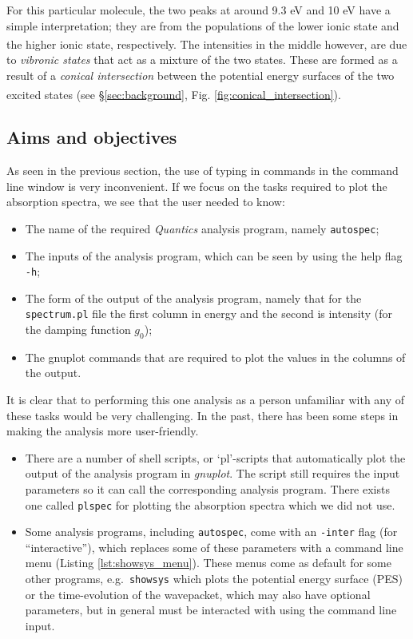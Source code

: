 \documentclass[12pt]{article}
\begin{document}
For this particular molecule, the two peaks at around 9.3 eV and 10 eV have a simple interpretation; they are from the populations of the lower ionic state and the higher ionic state, respectively.\textsuperscript{\cite{studying}} The intensities in the middle however, are due to \textit{vibronic states} that act as a mixture of the two states. These are formed as a result of a \textit{conical intersection} between the potential energy surfaces of the two excited states\textsuperscript{\cite{mysteryband}} (see \S\ref{sec:background}, Fig. \ref{fig:conical_intersection}).

\subsection{Aims and objectives}\label{ssec:aims}

As seen in the previous section, the use of typing in commands in the command line window is very inconvenient. If we focus on the tasks required to plot the absorption spectra, we see that the user needed to know:
\begin{itemize}
    \item The name of the required \textit{Quantics} analysis program, namely \texttt{autospec};
    \item The inputs of the analysis program, which can be seen by using the help flag \texttt{-h};
    \item The form of the output of the analysis program, namely that for the \texttt{spectrum.pl} file the first column in energy and the second is intensity (for the damping function \(g_0\));
    \item The gnuplot commands that are required to plot the values in the columns of the output.
\end{itemize}

\noindent It is clear that to performing this one analysis as a person unfamiliar with any of these tasks would be very challenging. In the past, there has been some steps in making the analysis more user-friendly.
\begin{itemize}
    \item There are a number of shell scripts, or `pl'-scripts that automatically plot the output of the analysis program in \textit{gnuplot}. The script still requires the input parameters so it can call the corresponding analysis program. There exists one called \texttt{plspec} for plotting the absorption spectra which we did not use.
    \item Some analysis programs, including \texttt{autospec}, come with an \texttt{-inter} flag (for ``interactive''), which replaces some of these parameters with a command line menu (Listing \ref{lst:showsys_menu}). These menus come as default for some other programs, e.g.~\texttt{showsys} which plots the potential energy surface (PES) or the time-evolution of the wavepacket, which may also have optional parameters, but in general must be interacted with using the command line input.
\end{itemize}
\end{document}
